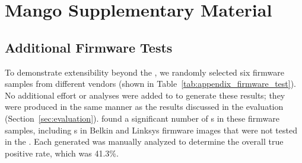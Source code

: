 
\appendix

\chapter{Mango Supplementary Material}
\label{app:mango}

\section{Additional Firmware Tests}
\label{app:mango-additional-firmware}

To demonstrate extensibility beyond the \karonteDataset, we randomly selected six firmware samples from different vendors (shown in Table~\ref{tab:appendix_firmware_test}).
No additional effort or analyses were added to \toolname to generate these results; they were produced in the same manner as the results discussed in the evaluation (Section~\ref{sec:evaluation}).
\toolname found a significant number of \trupoc{}s in these firmware samples, including \trupoc{}s in Belkin and Linksys firmware images that were not tested in the \karonteDataset.
Each generated \trupoc was manually analyzed to determine the overall true positive rate, which was 41.3\%.

